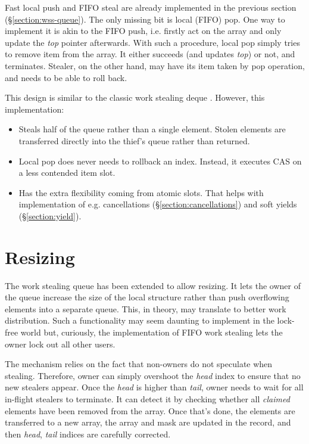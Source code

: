 \documentclass[12pt,a4paper,twoside]{report}
\begin{document}
Fast local push and FIFO steal are already implemented in the previous section (\S\ref{section:wss-queue}). The only missing bit is local (FIFO) pop. One way to implement it is akin to the FIFO push, i.e. firstly act on the array and only update the \textit{top} pointer afterwards. With such a procedure, local pop simply tries to remove item from the array. It either succeeds (and updates \textit{top}) or not, and terminates. Stealer, on the other hand, may have its item taken by pop operation, and needs to be able to roll back.

This design is similar to the classic work stealing deque \cite{Chase2005}. However, this implementation:
\begin{itemize}
    \item Steals half of the queue rather than a single element. Stolen elements are transferred directly into the thief's queue rather than returned.
    \item Local pop does never needs to rollback an index. Instead, it executes CAS on a less contended item slot.
    \item Has the extra flexibility coming from atomic slots. That helps with implementation of e.g. cancellations (\S\ref{section:cancellations}) and soft yields (\S\ref{section:yield}).
\end{itemize}

\section{Resizing}
\label{section:resizing_details}

The work stealing queue has been extended to allow resizing. It lets the owner of the queue increase the size of the local structure rather than push overflowing elements into a separate queue. This, in theory, may translate to better work distribution. Such a functionality may seem daunting to implement in the lock-free world but, curiously, the implementation of FIFO work stealing lets the owner lock out all other users. 

The mechanism relies on the fact that non-owners do not speculate when stealing. Therefore, owner can simply overshoot the \textit{head} index to ensure that no new stealers appear. Once the \textit{head} is higher than \textit{tail}, owner needs to wait for all in-flight stealers to terminate. It can detect it by checking whether all \textit{claimed} elements have been removed from the array. Once that's done, the elements are transferred to a new array, the array and mask are updated in the record, and then \textit{head}, \textit{tail} indices are carefully corrected.
\end{document}
